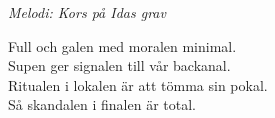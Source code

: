 {\footnotesize\textit{Melodi: Kors på Idas grav}}\par
\vspace{10pt}
Full och galen med moralen minimal.\\
Supen ger signalen till vår backanal.\\
Ritualen i lokalen är att tömma sin pokal.\\
Så skandalen i finalen är total.
